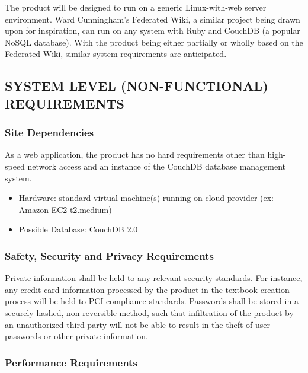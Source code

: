 \documentclass[letterpaper, 10pt, draftclsnofoot, compsoc, onecolumn]{IEEEtran}
\begin{document}
{\noindent
The product will be designed to run on a generic Linux-with-web server environment.
Ward Cunningham's Federated Wiki, a similar project being drawn upon for inspiration, can run
on any system with Ruby and CouchDB (a popular NoSQL database). With the product
being either partially or wholly based on the Federated Wiki, similar system
requirements are anticipated.

\subsection[SYSTEM LEVEL (NON{}-FUNCTIONAL) REQUIREMENTS]{\rmfamily\bfseries\color{black} SYSTEM LEVEL (NON-FUNCTIONAL) REQUIREMENTS}


\subsubsection[Site Dependencies]{\rmfamily\bfseries\color{black} Site Dependencies}
As a web application, the product has no hard requirements other than high-speed
network access and an instance of the CouchDB database management system.
\begin{itemize}
  \item Hardware: standard virtual machine(s) running on cloud provider (ex: Amazon EC2 
  t2.medium)
  \item Possible Database: CouchDB 2.0
\end{itemize}

\subsubsection[Safety, Security and Privacy Requirements]{\rmfamily\bfseries\color{black} Safety, Security and Privacy Requirements}

{\noindent 
Private information shall be held to any relevant security standards. For instance,
any credit card information processed by the product in the textbook creation process
will be held to PCI compliance standards. Passwords shall be stored in a securely hashed,
non-reversible method, such that infiltration of the product by an unauthorized
third party will not be able to result in the theft of user passwords or other private
information.}

\subsubsection[Performance Requirements]{\rmfamily\bfseries\color{black} Performance Requirements}

}
\end{document}

